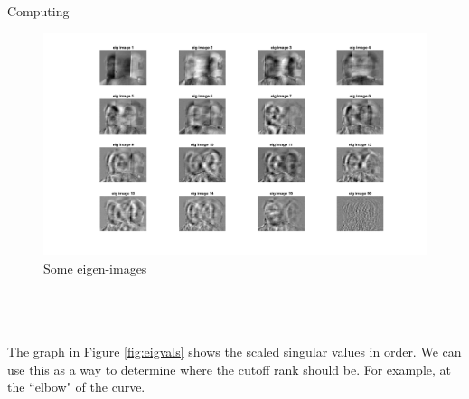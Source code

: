 \begin{section}{Computing}
{    \begin{minipage}{1.0\textwidth}
        \begin{figure}[H]
        \centering
        \includegraphics[trim={0cm 0cm 0cm 2cm},clip,width=0.85\columnwidth]{../data/eig_images}
        \setlength{\abovecaptionskip}{-20pt}
        \caption{Some eigen-images}
        \label{fig:eig_images}
        \end{figure}
    \end{minipage}
    \\
    \\
    \\
	The graph in Figure \ref{fig:eigvals} shows the scaled singular values in order. We can use this as a way to determine where the cutoff rank should be. For example, at the ``elbow" of the curve.
	\\
	\\
}

\end{section}
